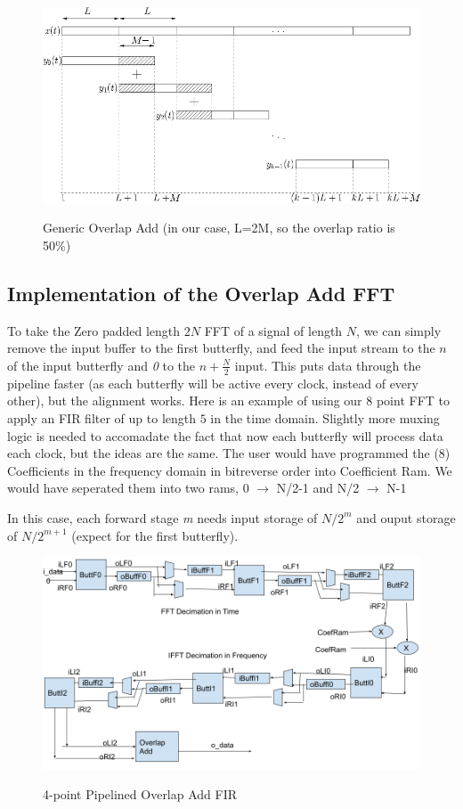 \documentclass{article}
\begin{document}
  \begin{figure}[h!]
    \centering
    \includegraphics[width=0.8\linewidth]{overlapadd.png}
    \label{fig:overlapadd}
    \caption{Generic Overlap Add (in our case, L=2M, so the overlap ratio is 50\%)}
  \end {figure}

\pagebreak

\subsection{Implementation of the Overlap Add FFT}

To take the Zero padded length $2N$ FFT of a signal of length $N$, we can simply remove the input buffer to the first butterfly, and feed the input stream to
the $n$ of the input butterfly and \emph{0} to the $n+\frac{N}{2}$ input. This puts data through the pipeline faster (as each butterfly will be active every clock, instead of
every other), but the alignment works. Here is an example of using our 8 point FFT to apply an FIR filter of up to length $5$ in the time domain.
Slightly more muxing logic is needed to accomadate the fact that now each butterfly will process data each clock, but the ideas  are the same.
The user would have programmed the (8) Coefficients in the frequency domain in bitreverse order into Coefficient Ram. We would have seperated them
into two rams, 0 $\rightarrow$ N/2-1 and N/2 $\rightarrow$ N-1

      In this case, each forward stage \emph{m} needs input storage of $N/2^{m}$ and ouput storage of $N/2^{m+1}$ (expect for the first butterfly).

  \begin{figure}[h!]
    \centering
    \includegraphics[width=0.7\linewidth]{fft_fir.png}
    \label{fig:fir}
    \caption{4-point Pipelined Overlap Add FIR}
  \end {figure}
\end{document}
